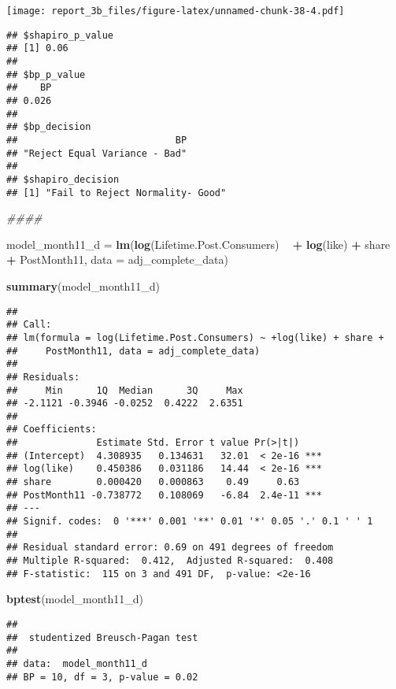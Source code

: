 \documentclass[
]{article}
\newenvironment{Shaded}{\begin{snugshade}}{\end{snugshade}}
\newcommand{\CommentTok}[1]{\textcolor[rgb]{0.56,0.35,0.01}{\textit{#1}}}
\newcommand{\DataTypeTok}[1]{\textcolor[rgb]{0.13,0.29,0.53}{#1}}
\newcommand{\KeywordTok}[1]{\textcolor[rgb]{0.13,0.29,0.53}{\textbf{#1}}}
\newcommand{\NormalTok}[1]{#1}
\newcommand{\OperatorTok}[1]{\textcolor[rgb]{0.81,0.36,0.00}{\textbf{#1}}}
\newcommand{\StringTok}[1]{\textcolor[rgb]{0.31,0.60,0.02}{#1}}
\begin{document}
\texttt{[image: report\_3b\_files/figure-latex/unnamed-chunk-38-4.pdf]}

\begin{verbatim}
## $shapiro_p_value
## [1] 0.06
## 
## $bp_p_value
##    BP 
## 0.026 
## 
## $bp_decision
##                            BP 
## "Reject Equal Variance - Bad" 
## 
## $shapiro_decision
## [1] "Fail to Reject Normality- Good"
\end{verbatim}

\begin{Shaded}
\begin{Highlighting}[]
\CommentTok{####}


\NormalTok{model_month11_d =}\StringTok{ }\KeywordTok{lm}\NormalTok{(}\KeywordTok{log}\NormalTok{(Lifetime.Post.Consumers) }\OperatorTok{~}\StringTok{  }\OperatorTok{+}\StringTok{ }\KeywordTok{log}\NormalTok{(like)  }\OperatorTok{+}\StringTok{ }\NormalTok{share  }\OperatorTok{+}\StringTok{ }\NormalTok{PostMonth11, }\DataTypeTok{data =}\NormalTok{ adj_complete_data)}

\KeywordTok{summary}\NormalTok{(model_month11_d)}
\end{Highlighting}
\end{Shaded}

\begin{verbatim}
## 
## Call:
## lm(formula = log(Lifetime.Post.Consumers) ~ +log(like) + share + 
##     PostMonth11, data = adj_complete_data)
## 
## Residuals:
##     Min      1Q  Median      3Q     Max 
## -2.1121 -0.3946 -0.0252  0.4222  2.6351 
## 
## Coefficients:
##              Estimate Std. Error t value Pr(>|t|)    
## (Intercept)  4.308935   0.134631   32.01  < 2e-16 ***
## log(like)    0.450386   0.031186   14.44  < 2e-16 ***
## share        0.000420   0.000863    0.49     0.63    
## PostMonth11 -0.738772   0.108069   -6.84  2.4e-11 ***
## ---
## Signif. codes:  0 '***' 0.001 '**' 0.01 '*' 0.05 '.' 0.1 ' ' 1
## 
## Residual standard error: 0.69 on 491 degrees of freedom
## Multiple R-squared:  0.412,  Adjusted R-squared:  0.408 
## F-statistic:  115 on 3 and 491 DF,  p-value: <2e-16
\end{verbatim}

\begin{Shaded}
\begin{Highlighting}[]
\KeywordTok{bptest}\NormalTok{(model_month11_d)}
\end{Highlighting}
\end{Shaded}

\begin{verbatim}
## 
##  studentized Breusch-Pagan test
## 
## data:  model_month11_d
## BP = 10, df = 3, p-value = 0.02
\end{verbatim}
\end{document}
